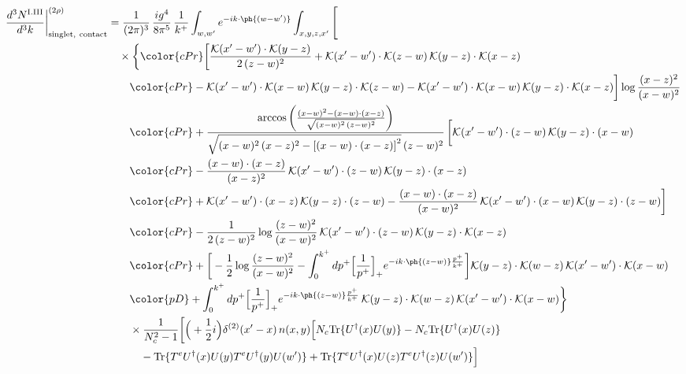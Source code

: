 \begin{align}
\frac{d^{3}N^{\rm I.III}}{d^{3}k}\bigg|^{(2\rho)}_{\rm singlet,\ contact}&=\frac{1}{(2\pi)^{3}}\,\frac{ig^{4}}{8\pi^{5}}\,\frac{1}{k^{+}}\int_{w,w'}e^{-ik\cdot\ph{(w-w')}}\int_{x,y,z,x'}\Bigg[\notag\\
&\quad\times\bigg\{{\color{cPr}\bigg[\frac{\mathcal{K}(x'-w')\cdot\mathcal{K}(y-z)}{2\,(z-w)^{2}}+\mathcal{K}(x'-w')\cdot\mathcal{K}(z-w)\,\mathcal{K}(y-z)\cdot\mathcal{K}(x-z)}\notag\\
&\qquad{\color{cPr}-\mathcal{K}(x'-w')\cdot\mathcal{K}(x-w)\,\mathcal{K}(y-z)\cdot\mathcal{K}(z-w)-\mathcal{K}(x'-w')\cdot\mathcal{K}(x-w)\,\mathcal{K}(y-z)\cdot\mathcal{K}(x-z)\bigg]\log\frac{(x-z)^{2}}{(x-w)^{2}}}\notag\\
&\qquad{\color{cPr}+\frac{\arccos\left(\frac{(x-w)^{2}-(x-w)\cdot (x-z)}{\sqrt{(x-w)^{2}\,(z-w)^{2}}}\right)}{\sqrt{(x-w)^{2}\,(x-z)^{2}-\left[(x-w)\cdot (x-z)\right]^{2}}\,(z-w)^{2}}\,\bigg[\mathcal{K}(x'-w')\cdot(z-w)\,\mathcal{K}(y-z)\cdot(x-w)}\notag\\
&\qquad{\color{cPr}-\frac{(x-w)\cdot(x-z)}{(x-z)^{2}}\,\mathcal{K}(x'-w')\cdot(z-w)\,\mathcal{K}(y-z)\cdot(x-z)}\notag\\
&\qquad{\color{cPr}+\mathcal{K}(x'-w')\cdot(x-z)\,\mathcal{K}(y-z)\cdot(z-w)-\frac{(x-w)\cdot(x-z)}{(x-w)^{2}}\,\mathcal{K}(x'-w')\cdot(x-w)\,\mathcal{K}(y-z)\cdot(z-w)\bigg]}\notag\\
&\qquad{\color{cPr}-\frac{1}{2\,(z-w)^{2}}\log\frac{(z-w)^{2}}{(x-w)^{2}}\,\mathcal{K}(x'-w')\cdot(z-w)\,\mathcal{K}(y-z)\cdot\mathcal{K}(x-z)}\notag\\
&\qquad{\color{cPr}+\bigg[-\frac{1}{2}\log\frac{(z-w)^{2}}{(x-w)^{2}}-\int_{0}^{k^{+}}dp^{+}\Big[\frac{1}{p^{+}}\Big]_{+}e^{-ik\cdot\ph{(z-w)}\frac{p^{+}}{k^{+}}}\bigg]\mathcal{K}(y-z)\cdot\mathcal{K}(w-z)\,\mathcal{K}(x'-w')\cdot\mathcal{K}(x-w)}\notag\\
&\qquad{\color{pD}+\int_{0}^{k^{+}}dp^{+}\Big[\frac{1}{p^{+}}\Big]_{+}e^{-ik\cdot\ph{(z-w)}\frac{p^{+}}{k^{+}}}\,\mathcal{K}(y-z)\cdot\mathcal{K}(w-z)\,\mathcal{K}(x'-w')\cdot\mathcal{K}(x-w)}\bigg\}\notag\\
&\qquad\times \frac{1}{N_{c}^{2}-1}\bigg[\Big(+\frac{1}{2}i\Big)\delta^{(2)}(x'-x)\,n(x,y)\Big[N_{c}{\rm Tr}\{U^{\dagger}(x)U(y)\}-N_{c}{\rm Tr}\{U^{\dagger}(x)U(z)\}\notag\\
&\qquad\quad -{\rm Tr}\{T^{e}U^{\dagger}(x)U(y)T^{e}U^{\dagger}(y)U(w')\}+{\rm Tr}\{T^{e}U^{\dagger}(x)U(z)T^{e}U^{\dagger}(z)U(w')\}\Big]\notag\\

\end{align}
